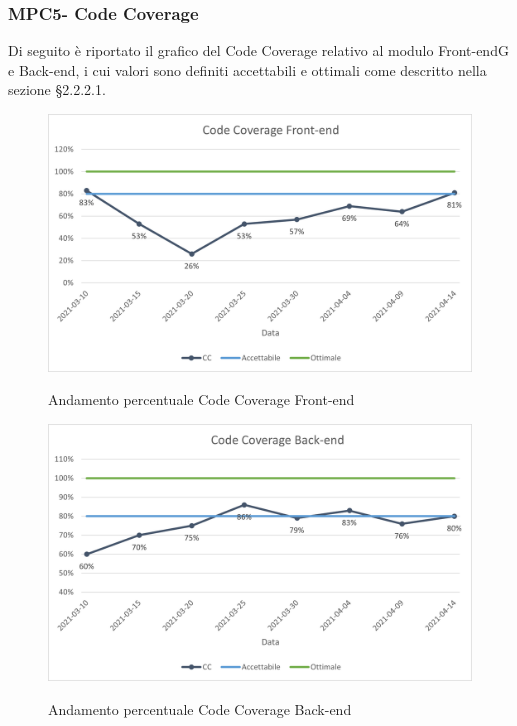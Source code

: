 \subsubsection{MPC5- Code Coverage}
Di seguito è riportato il grafico del Code Coverage relativo al modulo Front-end{G} e Back-end, i cui valori sono definiti accettabili e ottimali come descritto nella sezione §2.2.2.1.\\

\begin{figure}[H]
\centering
\includegraphics[scale=0.78]{res/ResocontoAttivitaDiVerifica/res/metriche/grafici/img/CCFE.png}\\
\caption{Andamento percentuale Code Coverage Front-end}
\end{figure}

\begin{figure}[H]
\centering
\includegraphics[scale=0.78]{res/ResocontoAttivitaDiVerifica/res/metriche/grafici/img/CCBE.png}\\
\caption{Andamento percentuale Code Coverage Back-end}
\end{figure}

